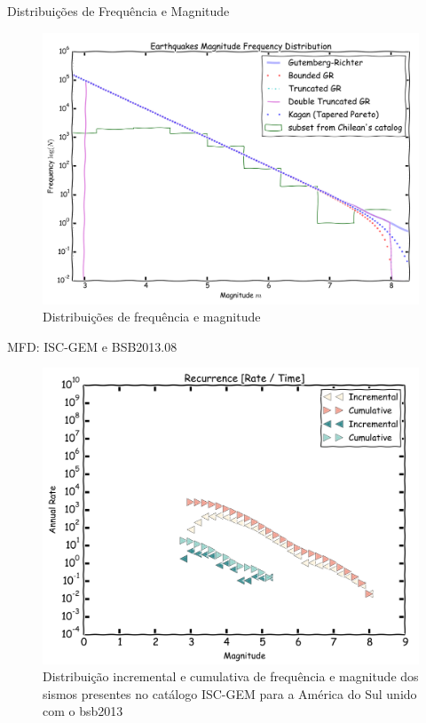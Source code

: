 \documentclass[ucs,8pt]{beamer}
\begin{document}
\begin{frame}{Distribuições de Frequência e Magnitude}
\begin{figure}[H]
   \centering
   \includegraphics[height=0.90\textheight]{mfd}
   \caption[Distribuições de frequência e magnitude]
   		   {Distribuições de frequência e magnitude} 
   \label{f:mfd}
\end{figure} 
\end{frame}



\begin{frame}{MFD: ISC-GEM e BSB2013.08}
\begin{figure}[H]
   \centering
   \includegraphics[height=0.90\textheight]{occurrence}
   \caption[Distribuição incremental e cumulativa de frequência e magnitude dos sismos presentes no catálogo ISC-GEM
   para a América do Sul unido com o \gls{bsb2013}]
   {Distribuição incremental e cumulativa de frequência e magnitude dos sismos presentes no catálogo ISC-GEM
   para a América do Sul unido com o \gls{bsb2013}} 
   \label{f:occurrence}
\end{figure} 
\end{frame}
\end{document}
